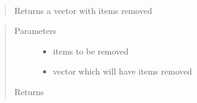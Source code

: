 \documentclass[letterpaper,10pt,english]{sphinxmanual}
\begin{document}
\begin{fulllineitems}
\label{\detokenize{yaocptool.util:yaocptool.util.util.remove_variables_from_vector}}~\begin{quote}

Returns a vector with items removed
\end{quote}
\begin{quote}\begin{description}
\item[{Parameters}] \leavevmode\begin{itemize}
\item {} 
 \textendash{} items to be removed

\item {} 
 \textendash{} vector which will have items removed

\end{itemize}

\item[{Returns}] \leavevmode


\end{description}\end{quote}

\end{fulllineitems}

\end{document}
